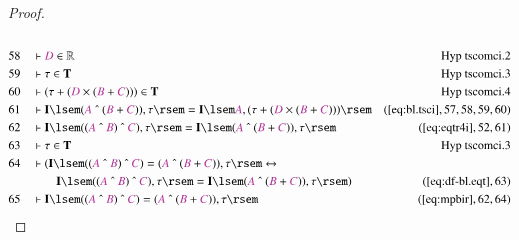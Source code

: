 \begin{proof}
\begin{align}
  \\ 58 &&  & \vdash \mc{D} \in
      \mathbb{R}&\text{Hyp~tscomci.2}\notag%
  \\ 59 &&  & \vdash \tau \in
      \mathbf{T}&\text{Hyp~tscomci.3}\notag%
  \\ 60 &&  & \vdash ( \tau + ( \mc{D} \times ( \mc{B} + \mc{C} ) ) ) \in
      \mathbf{T}&\text{Hyp~tscomci.4}\notag%
  \\ 61 &&  & \vdash \mathbf{I} \lsem ( \mc{A} ~\string^~ ( \mc{B} + \mc{C} ) )
      , \tau \rsem = \mathbf{I} \lsem \mc{A} , ( \tau + (
      \mc{D} \times ( \mc{B} + \mc{C} ) ) )
      \rsem&(\mbox{\ref{eq:bl.tsci}},57,58,59,60)\notag
  \\ 62 &&  & \vdash \mathbf{I} \lsem ( ( \mc{A} ~\string^~ \mc{B} ) ~\string^~
      \mc{C} ) , \tau \rsem = \mathbf{I} \lsem ( \mc{A}
      ~\string^~ ( \mc{B} + \mc{C} ) ) , \tau
      \rsem&(\mbox{\ref{eq:eqtr4i}},52,61)\notag
  \\ 63 &&  & \vdash \tau \in
      \mathbf{T}&\text{Hyp~tscomci.3}\notag%
  \\ 64 &&  & \vdash ( \mathbf{I} \lsem ( ( \mc{A} ~\string^~ \mc{B} )
      ~\string^~ \mc{C} ) = ( \mc{A} ~\string^~ ( \mc{B} +
      \mc{C} ) ) , \tau \rsem \leftrightarrow  \notag \\ & & & \qquad
      \mathbf{I}
      \lsem ( ( \mc{A} ~\string^~ \mc{B} ) ~\string^~
      \mc{C} ) , \tau \rsem = \mathbf{I} \lsem ( \mc{A}
      ~\string^~ ( \mc{B} + \mc{C} ) ) , \tau \rsem
      )&(\mbox{\ref{eq:df-bl.eqt}},63)\notag
  \\ 65 &&  & \vdash \mathbf{I} \lsem ( ( \mc{A} ~\string^~ \mc{B} ) ~\string^~
      \mc{C} ) = ( \mc{A} ~\string^~ ( \mc{B} + \mc{C} ) )
      , \tau \rsem&(\mbox{\ref{eq:mpbir}},62,64)\notag
\end{align}
\end{proof}

